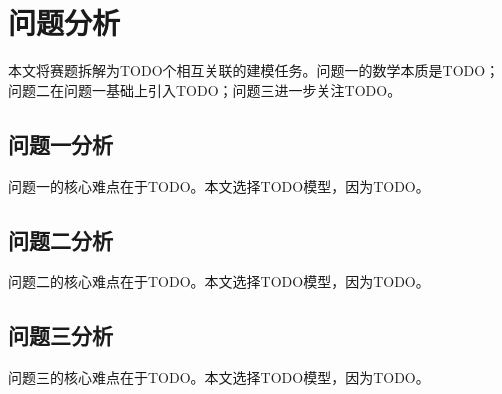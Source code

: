 \section{问题分析}

本文将赛题拆解为TODO个相互关联的建模任务。问题一的数学本质是TODO；问题二在问题一基础上引入TODO；问题三进一步关注TODO。

\subsection{问题一分析}

问题一的核心难点在于TODO。本文选择TODO模型，因为TODO。

\subsection{问题二分析}

问题二的核心难点在于TODO。本文选择TODO模型，因为TODO。

\subsection{问题三分析}

问题三的核心难点在于TODO。本文选择TODO模型，因为TODO。

